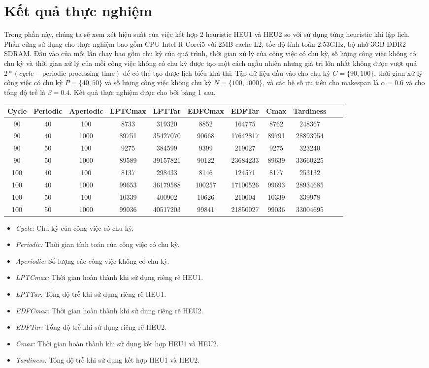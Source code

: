 \documentclass[a4paper,12pt]{article}
\begin{document}
\section{Kết quả thực nghiệm}
Trong phần này, chúng ta sẽ xem xét hiệu suất của việc kết hợp 2 heuristic HEU1 và HEU2 so với sử dụng từng heuristic khi lập lịch. Phần cứng sử dụng cho thực nghiệm bao gồm CPU Intel R Corei5 với 2MB cache L2, tốc độ tính toán 2.53GHz, bộ nhớ 3GB DDR2 SDRAM. Đầu vào của mỗi lần chạy bao gồm chu kỳ của quá trình, thời gian xử lý của công việc có chu kỳ, số lượng công việc không có chu kỳ và thời gian xử lý của mỗi công việc không có chu kỳ được tạo một cách ngẫu nhiên nhưng giá trị lớn nhất không được vượt quá $2*(cycle-\mbox{periodic processing time})$ để có thể tạo được lịch biểu khả thi. Tập dữ liệu đầu vào cho chu kỳ $C = \{90,100\}$, thời gian xử lý công việc có chu kỳ $P = \{40,50\}$ và số lượng công việc không chu kỳ $N = \{100,1000\}$, và các hệ số ưu tiên cho makespan là $\alpha = 0.6$ và cho tổng độ trễ là $\beta = 0.4$. Kết quả thực nghiệm được cho bởi bảng 1 sau.\\
\begin{center}
\begin{tabular}{|c|c|c|c|c|c|c|c|c|c|c|}
\hline
Cycle&Periodic&Aperiodic&LPTCmax&LPTTar&EDFCmax&EDFTar&Cmax&Tardiness\\
\hline
90&40&100&8733&319320&8852&164775&8762&248367\\
\hline
90&40&1000&89751&35427070&90668&17642817&89791&28893954\\
\hline
90&50&100&9275&384599&9399&219027&9275&323240\\
\hline
90&50&1000&89589&39157821&90122&23684233&89639&33660225\\
\hline
100&40&100&8137&298433&8146&124571&8177&253132\\
\hline
100&40&1000&99653&36179588&100257&17100526&99693&28934685\\
\hline
100&50&100&10339&400902&10626&210004&10339&339978\\
\hline
100&50&1000&99036&40517203&99841&21850027&99036&33004695\\
\hline
\end{tabular}
\end{center}
\begin{itemize}
\item
\textit{Cycle:} Chu kỳ của công việc có chu kỳ.
\item
\textit{Periodic:} Thời gian tính toán của công việc có chu kỳ.
\item
\textit{Aperiodic:} Số lượng các công việc không có chu kỳ.
\item
\textit{LPTCmax:} Thời gian hoàn thành khi sử dụng riêng rẽ HEU1.
\item
\textit{LPTTar:} Tổng độ trễ khi sử dụng riêng rẽ HEU1.
\item
\textit{EDFCmax:} Thời gian hoàn thành khi sử dụng riêng rẽ HEU2.
\item
\textit{EDFTar:} Tổng độ trễ khi sử dụng riêng rẽ HEU2.
\item
\textit{Cmax:} Thời gian hoàn thành khi sử dụng kết hợp HEU1 và HEU2.
\item
\textit{Tardiness:} Tổng độ trễ khi sử dụng kết hợp HEU1 và HEU2.
\end{itemize}
\end{document}
